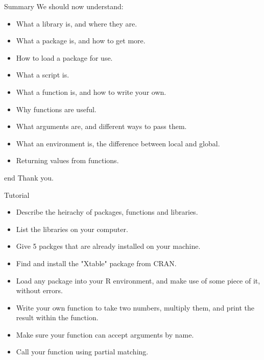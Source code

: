 \documentclass{beamer}\usepackage[]{graphicx}\usepackage[]{color}
\begin{document}
\begin{frame}[fragile]{Summary}
We should now understand:
\begin{itemize}
\item What a library is, and where they are.
\item What a package is, and how to get more.
\item How to load a package for use.
\item What a script is.
\item What a function is, and how to write your own.
\item Why functions are useful.
\item What arguments are, and different ways to pass them.
\item What an environment is, the difference between local and global.
\item Returning values from functions.
\end{itemize}
\end{frame}

\begin{frame}[fragile]{end}
Thank you.
\end{frame}

\begin{frame}[fragile]{Tutorial}



\begin{itemize}
\item Describe the heirachy of packages, functions and libraries.
\item List the libraries on your computer.
\item Give 5 packges that are already installed on your machine.
\item Find and install the "Xtable" package from CRAN.
\item Load any package into your R environment, and make use of some piece of it, without errors.
\item Write your own function to take two numbers, multiply them, and print the result within the function.
\item Make sure your function can accept arguments by name.
\item Call your function using partial matching.
\end{itemize}
\end{frame}
\end{document}

